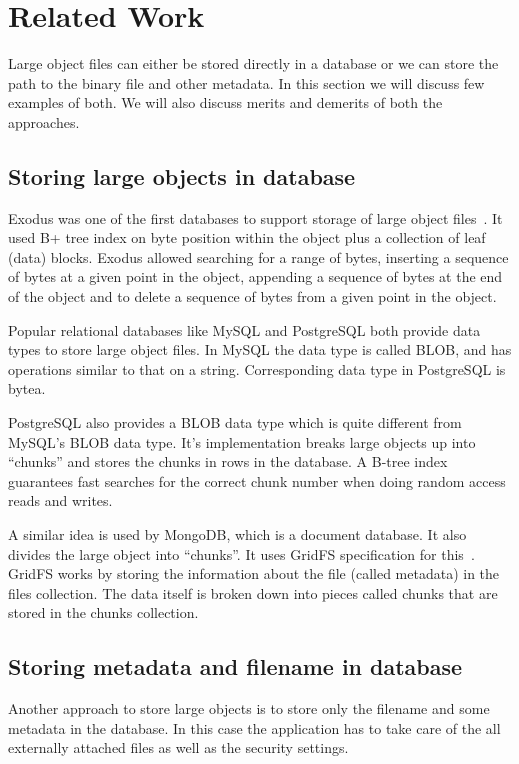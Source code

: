 \chapter{Related Work}
\label{chap:relatedwork}

Large object files can either be stored directly in a database or we can store the path to the binary file and other metadata. In this section we will discuss few examples of both. We will also discuss merits and demerits of both the approaches.

\section{Storing large objects in database}

Exodus was one of the first databases to support storage of large object files~\cite{carey1986object}. It used B+ tree index on byte position within the object plus a collection of leaf (data) blocks. Exodus allowed searching for a range of bytes, inserting a sequence of bytes at a given point in the object, appending a sequence of bytes at the end of the object and to delete a sequence of bytes from a given point in the object.

Popular relational databases like MySQL and PostgreSQL both provide data types to store large object files. In MySQL the data type is called BLOB, and has operations similar to that on a string. Corresponding data type in PostgreSQL is bytea.

PostgreSQL also provides a BLOB data type which is quite different from MySQL's BLOB data type. It's implementation breaks large objects up into ``chunks'' and stores the chunks in rows in the database. A B-tree index guarantees fast searches for the correct chunk number when doing random access reads and writes.

A similar idea is used by MongoDB, which is a document database. It also divides the large object into ``chunks''. It uses GridFS specification for this~\cite{hows2014gridfs}. GridFS works by storing the information about the file (called metadata) in the files collection. The data itself is broken down into pieces called chunks that are stored in the chunks collection.

\section{Storing metadata and filename in database}

Another approach to store large objects is to store only the filename and some metadata in the database. In this case the application has to take care of the all externally attached files as well as the security settings.

